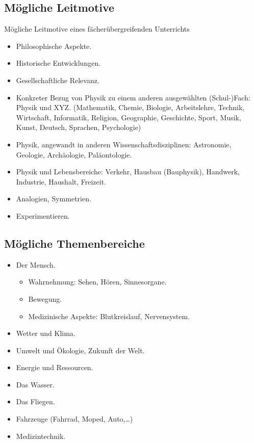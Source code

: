 \subsection{M\"{o}gliche Leitmotive}
M\"{o}gliche Leitmotive eines f\"{a}cher\"{u}bergreifenden Unterrichts
\begin{itemize}
\setlength{\itemsep}{0mm}
\item
Philosophische Aspekte.
\item
Historische Entwicklungen.
\item
Gesellschaftliche Relevanz.
\item
Konkreter Bezug von Physik zu einem anderen ausgew\"{a}hlten
(Schul-)Fach: Physik und XYZ.
(Mathematik, Chemie, Biologie, Arbeitslehre, Technik, Wirtschaft,
Informatik, Religion, Geographie, Geschichte, Sport, Musik,
Kunst, Deutsch, Sprachen, Psychologie)
\item
Physik, angewandt in anderen Wissenschaftsdisziplinen:
Astronomie, Geologie, Arch\"{a}ologie, Pal\"{a}ontologie.
\item
Physik und Lebensbereiche:
Verkehr, Hausbau (Bauphysik), Handwerk,
Industrie, Haushalt, Freizeit.
\item
Analogien, Symmetrien.
\item
Experimentieren.
\end{itemize}

\subsection{M\"{o}gliche Themenbereiche}
\begin{itemize}
\setlength{\itemsep}{0mm}
\item Der Mensch.
\begin{itemize}
\setlength{\itemsep}{0mm}
\item
Wahrnehmung: Sehen, H\"{o}ren, Sinnesorgane.
\item
Bewegung.
\item
Medizinische Aspekte: Blutkreislauf, Nervensystem.
\end{itemize}
\end{itemize}
\begin{itemize}
\item Wetter und Klima.
\item Umwelt und \"{O}kologie, Zukunft der Welt.
\item Energie und Ressourcen.
\item Das Wasser.
\item Das Fliegen.
\item Fahrzeuge (Fahrrad, Moped, Auto,\dots)
\item Medizintechnik.
\end{itemize}




